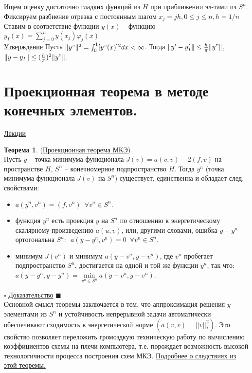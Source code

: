 \documentclass[specialist, subf, href, colorlinks=true, 12pt, times, mtpro, final]{disser}
\theoremstyle{definition}
\newtheorem{theorem}{Теорема}[section]
\begin{document}
{    Ищем оценку достаточно гладких функций из $H$ при приближении эл-тами из $S^n$. \\
    Фиксируем разбиение отрезка с постоянным шагом $x_j = jh, 0 \leq j \leq n, h = 1/n$\\
    Ставим в соответствие функции $y(x)$ \---
    функцию $ y_I (x) = \sum\limits^n_{j=0} y(x_j)\varphi_j(x)$\\
    
    \hyperlink {lects.102}{Утверждение}  Пусть $\|y"\|^2 = \int^1_0 [y"(x)]^2dx < \infty$. Тогда
    $\|y' - y'_I\| \leq \frac{h}{\pi}\|y"\|$,  $\|y-y_I\| \leq (\frac{h}{\pi})^2\|y"\|$.

\section {Проекционная теорема в методе конечных элементов.}
    \hyperlink {lects.103}{Лекции}
    \begin{theorem} (\hyperlink {lects.103}{Проекционная теорема МКЭ})\\
    Пусть $y$ -- точка минимума функционала $J(v) = a(v,v) - 2(f,v)$ на пространстве
    $H$, $S^n$ -- конечномерное подпространство $H$. Тогда $y^n$ (точка минимума
    функционала $J(v)$ на $S^n$) существует, единственна и обладает след. свойствами:
    \begin{itemize}
    \item $a(y^n,v^n) = (f,v^n)\,\,\, \forall v^n \in S^n$.
    \item функция $y^n$ есть проекция $y$ на $S^n$ по отношению к энергетическому скалярному
    произведению $a(u,v)$, или, другими словами, ошибка $y-y^n$ ортогональна $S^n$:\,\,
    $a(y-y^n,v^n) = 0 \,\,\, \forall v^n \in S^n$.
    \item минимум $J(v^n)$ и минимум $a(y-v^n, y-v^n)$, где $v^n$ пробегает подпространство
    $S^n$, достигается на одной и той же функции $y^n$, так что:
    $a(y-y^n,y-y^n) = \min\limits_{v^n\in S^n} a(y-v^n,y-v^n)$.
    \end{itemize}
    \end{theorem}
    \noindent$\square$ \hyperlink {lects.104}{Доказательство} $\blacksquare$\\
    Основной смысл теоремы заключается в том, что аппроксимация решения $y$ элементами
    из $S^n$ и устойчивость непрерывной задачи автоматически обеспечивают сходимость в
    энергетической норме $(a(v,v) = ||v||_*^2)$. Это свойство позволяет переложить
    громоздкую техническую работу по вычислению коэффициентов схемы на плечи компьютера,
    т.е. порождает возможность высокой технологичности процесса построения схем МКЭ.
    \hyperlink {lects.105}{Подробнее о следствиях из этой теоремы.}

}
\end{document}
